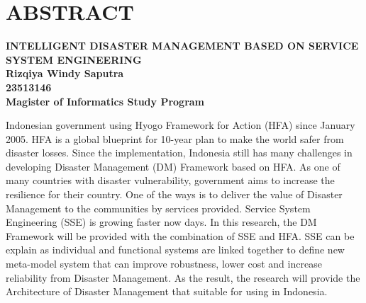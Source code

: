 \documentclass[12pt]{report}
\numberwithin{figure}{section}
\numberwithin {figure}{subsection}
\numberwithin {table}{section}
\numberwithin {table}{subsection}
\begin{document}
\clearpage
{}
\chapter*{ABSTRACT}
\begin{center}
	\large
		\textbf{INTELLIGENT DISASTER MANAGEMENT BASED ON SERVICE SYSTEM ENGINEERING}\\
	\vspace{0.5cm} %
	\normalsize
		\textbf{Rizqiya Windy Saputra}\\
		\textbf{23513146}\\
		\textbf{Magister of Informatics Study Program}
\end{center}

	Indonesian government using Hyogo Framework for Action (HFA) since January 2005. HFA is a global blueprint for 10-year plan to make the world safer from disaster losses. Since the implementation, Indonesia still has many challenges in developing Disaster Management (DM) Framework based on HFA. As one of many countries with disaster vulnerability, government aims to increase the resilience for their country. One of the ways is to deliver the value of Disaster Management to the communities by services provided. Service System Engineering (SSE) is growing faster now days. In this research, the DM Framework will be provided with the combination of SSE and HFA. SSE can be explain as individual and functional systems are linked together to define new meta-model system that can improve robustness, lower cost and increase reliability from Disaster Management. As the result, the research will provide the Architecture of Disaster Management that suitable for using in Indonesia.
\doublespacing

\tableofcontents
{}
\listoftables
{}
\listoffigures
{}

\glsaddall
\printglossary[title={List of Terms}] %
\printacronyms[title=List of Abbreviations] %
\renewcommand*{\glossarypreamble}{\thispagestyle{fancy}}
\renewcommand{\bibname}{References}
\end{document}
